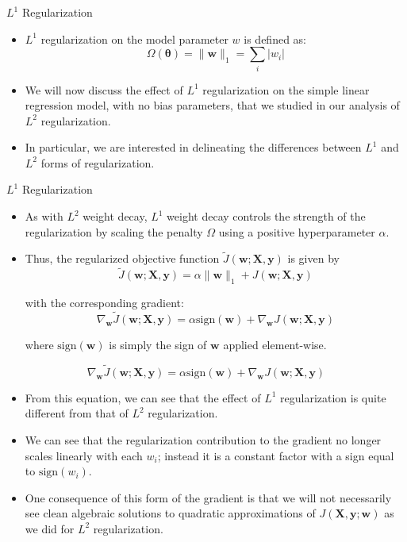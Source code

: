 \documentclass[10pt]{beamer}
\begin{document}
	\begin{frame}{$L^1$ Regularization}
		\begin{itemize}
			\item $L^1$ regularization on the model parameter $w$ is defined as:
			$$\Omega(\bm{\theta})=\lVert\bm{w}\rVert_1=\sum_i\left|w_i\right|$$
			
			\item We will now discuss the effect of $L^1$ regularization on the simple linear regression model, with no bias parameters, that we studied in our analysis of $L^2$ regularization.
			\pause
			\item In particular, we are interested in delineating the differences between $L^1$ and $L^2$ forms of regularization.
		\end{itemize}
	\end{frame}

	\begin{frame}{$L^1$ Regularization}
		\begin{itemize}
			\item As with $L^2$ weight decay, $L^1$ weight decay controls the strength of the regularization by scaling the penalty $\Omega$ using a positive hyperparameter $\alpha$.
			\pause
			\item Thus, the regularized objective function $\tilde{J}(\bm{w};\bm{X},\bm{y})$ is given by
			$$\tilde{J}(\bm{w};\bm{X},\bm{y})=\alpha\lVert\bm{w}\rVert_1+J(\bm{w;\bm{X},\bm{y}})$$
			
			\pause
			with the corresponding gradient:
			$$\nabla_{\bm{w}}\tilde{J}(\bm{w};\bm{X},\bm{y})=\alpha\mathrm{sign}(\bm{w})+\nabla_{\bm{w}}J(\bm{w};\bm{X},\bm{y})$$
			
			\pause
			where $\mathrm{sign}(\bm{w})$ is simply the sign of $\bm{w}$ applied element-wise.
			
		\end{itemize}
	\end{frame}

	\begin{frame}{}
		$$\nabla_{\bm{w}}\tilde{J}(\bm{w};\bm{X},\bm{y})=\alpha\mathrm{sign}(\bm{w})+\nabla_{\bm{w}}J(\bm{w};\bm{X},\bm{y})$$
		\begin{itemize}
			\item From this equation, we can see that the effect of $L^1$ regularization is quite different from that of $L^2$ regularization.
			\pause
			\item We can see that the regularization contribution to the gradient no longer scales linearly with each $w_i$; instead it is a constant factor with a sign equal to $\mathrm{sign}(w_i)$.
			\pause
			\item One consequence of this form of the gradient is that we will not necessarily see clean algebraic solutions to quadratic approximations of $J(\bm{X},\bm{y};\bm{w})$ as we did for $L^2$ regularization.
		\end{itemize}
	\end{frame}
	
\end{document}
